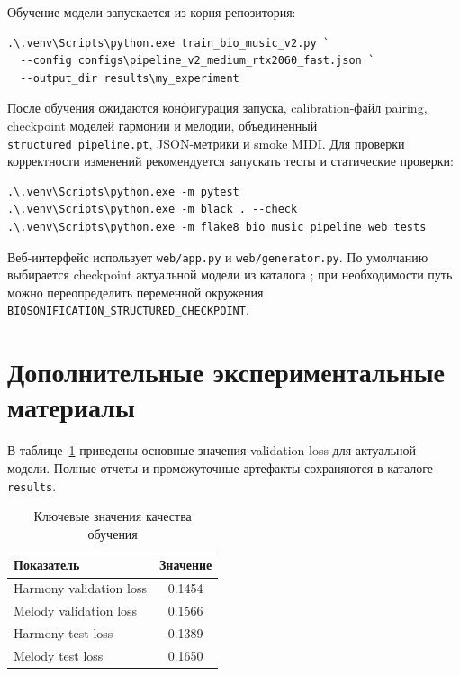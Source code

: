 Обучение модели запускается из корня репозитория:

\begin{verbatim}
.\.venv\Scripts\python.exe train_bio_music_v2.py `
  --config configs\pipeline_v2_medium_rtx2060_fast.json `
  --output_dir results\my_experiment
\end{verbatim}

После обучения ожидаются конфигурация запуска, calibration-файл pairing, checkpoint моделей гармонии и мелодии, объединенный \texttt{structured\_pipeline.pt}, JSON-метрики и smoke MIDI. Для проверки корректности изменений рекомендуется запускать тесты и статические проверки:

\begin{verbatim}
.\.venv\Scripts\python.exe -m pytest
.\.venv\Scripts\python.exe -m black . --check
.\.venv\Scripts\python.exe -m flake8 bio_music_pipeline web tests
\end{verbatim}

Веб-интерфейс использует \texttt{web/app.py} и \texttt{web/generator.py}. По умолчанию выбирается checkpoint актуальной модели из каталога ; при необходимости путь можно переопределить переменной окружения \texttt{BIOSONIFICATION\_STRUCTURED\_CHECKPOINT}.

\section{Дополнительные экспериментальные материалы}

В таблице~\ref{tab:appendix-training-short} приведены основные значения validation loss для актуальной модели. Полные отчеты и промежуточные артефакты сохраняются в каталоге \texttt{results}.

\begin{table}[htbp]
\centering
\caption{Ключевые значения качества обучения}
\label{tab:appendix-training-short}
\begin{tabular}{|p{}|c|}
\hline
\textbf{Показатель} & \textbf{Значение} \\
\hline
Harmony validation loss & 0.1454 \\
\hline
Melody validation loss & 0.1566 \\
\hline
Harmony test loss & 0.1389 \\
\hline
Melody test loss & 0.1650 \\
\hline
\end{tabular}
\end{table}

